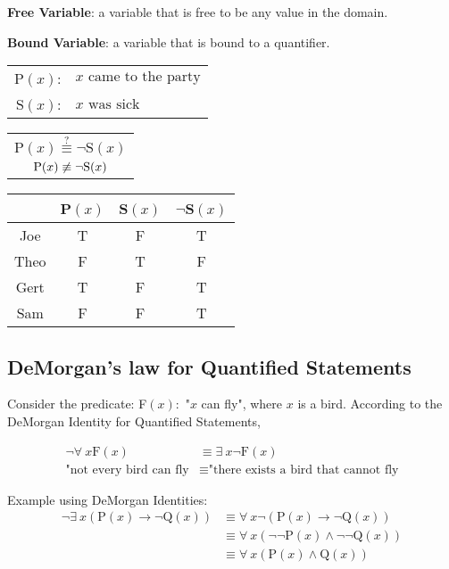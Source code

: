 \noindent \textbf{Free Variable}: a variable that is free to be any value in the domain.

\noindent \textbf{Bound Variable}: a variable that is bound to a quantifier.

\begin{center}
  \begin{tabular}{rl}
    $\text{P}(x)$: & $x \text{ came to the party}$ \\
    $\text{S}(x)$: & $x \text{ was sick}$          \\
  \end{tabular}
  \qquad
  \begin{tabular}{c}
    $\text{P}(x) \overset{?}{\equiv} \lnot \text{S}(x)$ \\
    $\text{P}(x) \centernot{\equiv} \lnot \text{S}(x)$
  \end{tabular}
  \qquad
  \begin{tabular}{c|ccc}
         & P$(x)$ & S$(x)$ & $\lnot$S$(x)$ \\
    \hline
    Joe  & T      & F      & T             \\
    Theo & F      & T      & F             \\
    Gert & T      & F      & T             \\
    Sam  & F      & F      & T
  \end{tabular}
\end{center}

\subsection{DeMorgan's law for Quantified Statements}


Consider the predicate: F$(x):$ "$x$ can fly", where $x$ is a bird.
According to the DeMorgan Identity for Quantified Statements,

\begin{align*}
  \lnot \forall~ x \text{F}(x)    & \equiv \exists~ x \lnot \text{F}(x)                 \\
  \text{"not every bird can fly} & \equiv \text{"there exists a bird that cannot fly}
\end{align*}

Example using DeMorgan Identities:
\begin{align*}
  \lnot \exists~ x (\text{P}(x) \rightarrow \lnot \text{Q}(x)) & \equiv \forall~ x \lnot (\text{P}(x) \rightarrow \lnot \text{Q}(x))          \\
                                                           & \equiv \forall~ x (\lnot \lnot \text{P}(x) \land \lnot \lnot \text{Q}(x)) \\
                                                           & \equiv \forall~ x (\text{P}(x) \land \text{Q}(x))
\end{align*}

